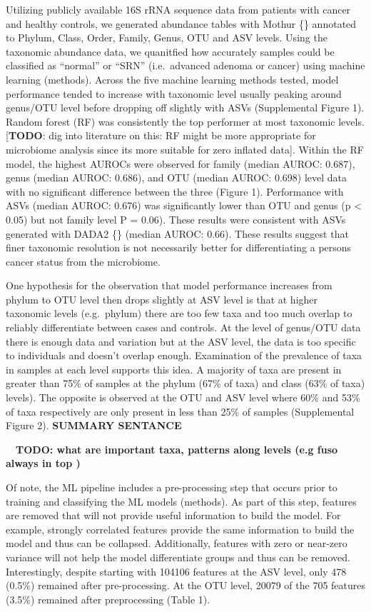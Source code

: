 \documentclass[
]{article}
\begin{document}
Utilizing publicly available 16S rRNA sequence data from patients with
cancer and healthy controls, we generated abundance tables with Mothur
\{\} annotated to Phylum, Class, Order, Family, Genus, OTU and ASV
levels. Using the taxonomic abundance data, we quanitfied how accurately
samples could be classified as ``normal'' or ``SRN'' (i.e.~advanced
adenoma or cancer) using machine learning (methods). Across the five
machine learning methods tested, model performance tended to increase
with taxonomic level usually peaking around genus/OTU level before
dropping off slightly with ASVs (Supplemental Figure 1). Random forest
(RF) was consistently the top performer at most taxonomic levels.
{[}\textbf{TODO}: dig into literature on this: RF might be more
appropriate for microbiome analysis since its more suitable for zero
inflated data{]}. Within the RF model, the highest AUROCs were observed
for family (median AUROC: 0.687), genus (median AUROC: 0.686), and OTU
(median AUROC: 0.698) level data with no significant difference between
the three (Figure 1). Performance with ASVs (median AUROC: 0.676) was
significantly lower than OTU and genus (p \textless{} 0.05) but not
family level P = 0.06). These results were consistent with ASVs
generated with DADA2 \{\} (median AUROC: 0.66). These results suggest
that finer taxonomic resolution is not necessarily better for
differentiating a persons cancer status from the microbiome.

One hypothesis for the observation that model performance increases from
phylum to OTU level then drops slightly at ASV level is that at higher
taxonomic levels (e.g.~phylum) there are too few taxa and too much
overlap to reliably differentiate between cases and controls. At the
level of genus/OTU data there is enough data and variation but at the
ASV level, the data is too specific to individuals and doesn't overlap
enough. Examination of the prevalence of taxa in samples at each level
supports this idea. A majority of taxa are present in greater than 75\%
of samples at the phylum (67\% of taxa) and class (63\% of taxa)
levels). The opposite is observed at the OTU and ASV level where 60\%
and 53\% of taxa respectively are only present in less than 25\% of
samples (Supplemental Figure 2). \textbf{SUMMARY SENTANCE}

~~\textbf{TODO: what are important taxa, patterns along levels (e.g fuso
always in top )}

Of note, the ML pipeline includes a pre-processing step that occurs
prior to training and classifying the ML models (methods). As part of
this step, features are removed that will not provide useful information
to build the model. For example, strongly correlated features provide
the same information to build the model and thus can be collapsed.
Additionally, features with zero or near-zero variance will not help the
model differentiate groups and thus can be removed. Interestingly,
despite starting with 104106 features at the ASV level, only 478 (0.5\%)
remained after pre-processing. At the OTU level, 20079 of the 705
features (3.5\%) remained after preprocessing (Table 1).
\end{document}
